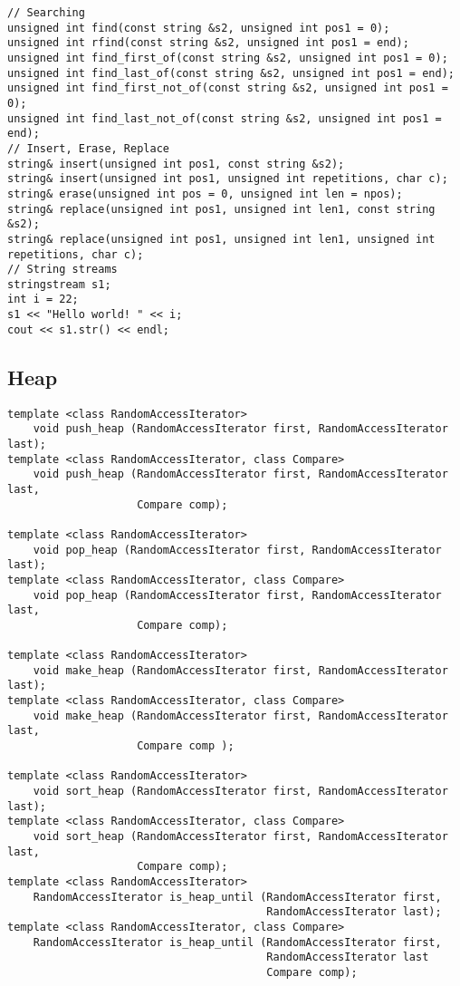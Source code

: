 \documentclass[a4paper]{article}
\begin{document}
\begin{verbatim}
// Searching
unsigned int find(const string &s2, unsigned int pos1 = 0);
unsigned int rfind(const string &s2, unsigned int pos1 = end);
unsigned int find_first_of(const string &s2, unsigned int pos1 = 0);
unsigned int find_last_of(const string &s2, unsigned int pos1 = end);
unsigned int find_first_not_of(const string &s2, unsigned int pos1 = 0);
unsigned int find_last_not_of(const string &s2, unsigned int pos1 = end);
// Insert, Erase, Replace
string& insert(unsigned int pos1, const string &s2);
string& insert(unsigned int pos1, unsigned int repetitions, char c);
string& erase(unsigned int pos = 0, unsigned int len = npos);
string& replace(unsigned int pos1, unsigned int len1, const string &s2);
string& replace(unsigned int pos1, unsigned int len1, unsigned int repetitions, char c);
// String streams
stringstream s1;
int i = 22;
s1 << "Hello world! " << i;
cout << s1.str() << endl;
\end{verbatim}

\subsection{Heap}

\begin{verbatim}
template <class RandomAccessIterator>
	void push_heap (RandomAccessIterator first, RandomAccessIterator last);
template <class RandomAccessIterator, class Compare>
	void push_heap (RandomAccessIterator first, RandomAccessIterator last,
					Compare comp);
					
template <class RandomAccessIterator>
	void pop_heap (RandomAccessIterator first, RandomAccessIterator last);
template <class RandomAccessIterator, class Compare>
	void pop_heap (RandomAccessIterator first, RandomAccessIterator last,
					Compare comp);
					
template <class RandomAccessIterator>
	void make_heap (RandomAccessIterator first, RandomAccessIterator last);
template <class RandomAccessIterator, class Compare>
	void make_heap (RandomAccessIterator first, RandomAccessIterator last,
					Compare comp );
					
template <class RandomAccessIterator>
	void sort_heap (RandomAccessIterator first, RandomAccessIterator last);
template <class RandomAccessIterator, class Compare>
	void sort_heap (RandomAccessIterator first, RandomAccessIterator last,
					Compare comp);
template <class RandomAccessIterator>
	RandomAccessIterator is_heap_until (RandomAccessIterator first,
										RandomAccessIterator last);
template <class RandomAccessIterator, class Compare>
	RandomAccessIterator is_heap_until (RandomAccessIterator first,
										RandomAccessIterator last
										Compare comp);
\end{verbatim}
\end{document}
